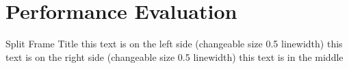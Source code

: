 \section{Performance Evaluation}

\begin{splitframe}{0.5}{0.5}{Split Frame Title}
{this text is on the left side (changeable size 0.5 linewidth)}
{this text is on the right side (changeable size 0.5 linewidth)}
this text is in the middle
\end{splitframe}